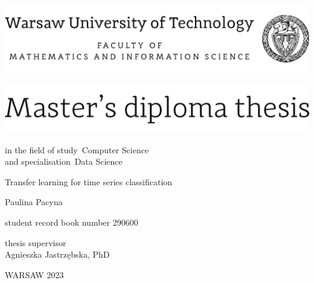 \documentclass[12pt,twoside,a4paper]{article}
\newcommand{\discipline}{Computer Science}
\renewcommand{\title}{Transfer learning for time series classification}
\newcommand{\supervisor}{Agnieszka Jastrzębska, PhD}
\newcommand{\spec}{Data Science}
\renewcommand{\year}{2023}
\newcommand{\authori}{Paulina Pacyna}
\newcommand{\albumi}{290600}
\begin{document}
\pagestyle{empty}


\begin{center}
\includegraphics[scale=1.]{img/wut}
\vspace{40pt}


\includegraphics[scale=1.]{img/master} %

{ \arial
in the field of study~\discipline 
\\
and specialisation~\spec

\vspace{30pt}
{\arial \large \title}


\vspace{40pt}

{\arial \huge \authori }

\vspace{5pt}

student record book number \albumi


\vspace{40pt}

thesis supervisor \\
{\arial \supervisor}


\vfill
 
WARSAW \year \\
}
\end{center}


%
%
\end{document}
